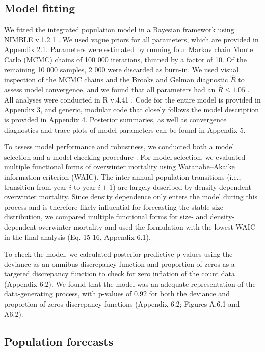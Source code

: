 \documentclass{article}
\begin{document}
\subsection{Model fitting}
We fitted the integrated population model in a Bayesian framework using NIMBLE v.1.2.1 \parencite{de2017programming}. We used vague priors for all parameters, which are provided in Appendix 2.1. Parameters were estimated by running four Markov chain Monte Carlo (MCMC) chains of 100 000 iterations, thinned by a factor of 10. Of the remaining 10 000 samples, 2 000 were discarded as burn-in. We used visual inspection of the MCMC chains and the Brooks and Gelman diagnostic $\hat{R}$ to assess model convergence, and we found that all parameters had an $\hat{R} \leq 1.05$ \parencite{brooks1998general}. All analyses were conducted in R v.4.41 \parencite{Rcore}. Code for the entire model is provided in Appendix 3, and generic, modular code that closely follows the model description is provided in Appendix 4. Posterior summaries, as well as convergence diagnostics and trace plots of model parameters can be found in Appendix 5.

To assess model performance and robustness, we conducted both a model selection and a model checking procedure \parencite{conn2018guide}. For model selection, we evaluated multiple functional forms of overwinter mortality using Watanabe–Akaike information criterion (WAIC). The inter-annual population transitions (i.e., transition from year $i$ to year $i + 1$) are largely described by density-dependent overwinter mortality. Since density dependence only enters the model during this process and is therefore likely influential for forecasting the stable size distribution, we compared multiple functional forms for size- and density-dependent overwinter mortality and used the formulation with the lowest WAIC in the final analysis (Eq. 15-16, Appendix 6.1).

To check the model, we calculated posterior predictive p-values using the deviance as an omnibus discrepancy function and proportion of zeros as a targeted discrepancy function to check for zero inflation of the count data (Appendix 6.2). We found that the model was an adequate representation of the data-generating process, with p-values of 0.92 for both the deviance and proportion of zeros discrepancy functions (Appendix 6.2; Figures A.6.1 and A6.2).


\subsection{Population forecasts}
\end{document}
